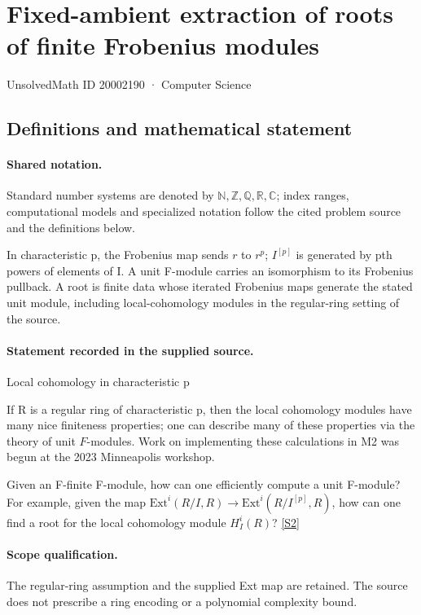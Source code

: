 \documentclass[11pt]{article}
\newcommand{\sref}[2]{\hyperlink{source:#1:#2}{[S#2]}}
\begin{document}
\setcounter{section}{20002189}
\section{Fixed-ambient extraction of roots of finite Frobenius modules}\label{20002190}
{\small\sffamily UnsolvedMath ID 20002190 · Computer Science}
\subsection{Definitions and mathematical statement}

\paragraph{Shared notation.}Standard number systems are denoted by $\mathbb N,\mathbb Z,\mathbb Q,\mathbb R,\mathbb C$; index ranges, computational models and specialized notation follow the cited problem source and the definitions below.


In characteristic p, the Frobenius map sends $r$ to $r^p$; $I^{[p]}$ is generated by pth powers of elements of I. A unit F-module carries an isomorphism to its Frobenius pullback. A root is finite data whose iterated Frobenius maps generate the stated unit module, including local-cohomology modules in the regular-ring setting of the source.
\paragraph{Statement recorded in the supplied source.}
Local cohomology in characteristic p

If R is a regular ring of characteristic p, then the local cohomology modules have many nice finiteness properties; one can describe many of these properties via the theory of unit $F$-modules. Work on implementing these calculations in M2 was begun at the 2023 Minneapolis workshop.

Given an F-finite F-module, how can one efficiently compute a unit F-module? For example, given the map $\mathrm{Ext}^i(R/I,R)\to \mathrm{Ext}^i(R/I^{[p]},R)$, how can one find a root for the local cohomology module $H^i_I(R)$? \sref{20002190}{2}
\paragraph{Scope qualification.}
The regular-ring assumption and the supplied Ext map are retained. The source does not prescribe a ring encoding or a polynomial complexity bound.
\end{document}
